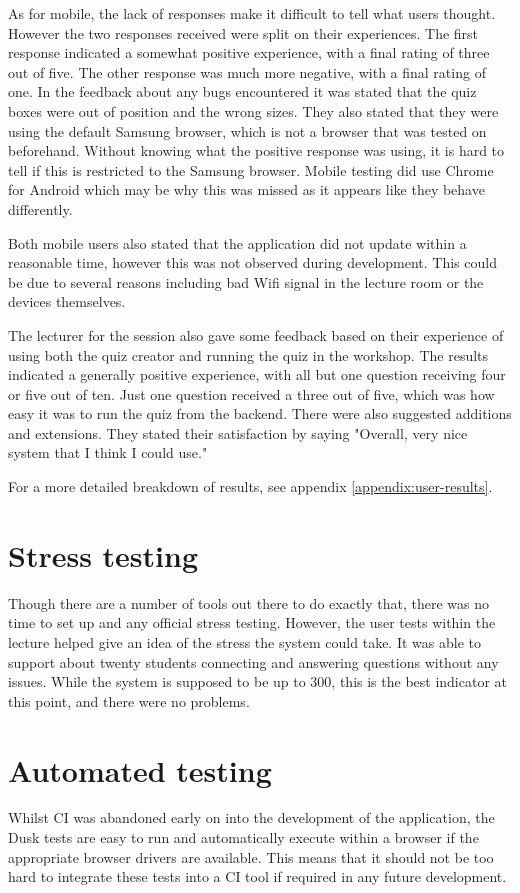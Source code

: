 As for mobile, the lack of responses make it difficult to tell what users thought. However the two responses received were split on their experiences. The first response indicated a somewhat positive experience, with a final rating of three out of five. The other response was much more negative, with a final rating of one. In the feedback about any bugs encountered it was stated that the quiz boxes were out of position and the wrong sizes. They also stated that they were using the default Samsung browser, which is not a browser that was tested on beforehand. Without knowing what the positive response was using, it is hard to tell if this is restricted to the Samsung browser. Mobile testing did use Chrome for Android which may be why this was missed as it appears like they behave differently.

Both mobile users also stated that the application did not update within a reasonable time, however this was not observed during development. This could be due to several reasons including bad Wifi signal in the lecture room or the devices themselves.

The lecturer for the session also gave some feedback based on their experience of using both the quiz creator and running the quiz in the workshop. The results indicated a generally positive experience, with all but one question receiving four or five out of ten. Just one question received a three out of five, which was how easy it was to run the quiz from the backend. There were also suggested additions and extensions. They stated their satisfaction by saying "Overall, very nice system that I think I could use."

For a more detailed breakdown of results, see appendix \ref{appendix:user-results}.

\section{Stress testing}
Though there are a number of tools out there to do exactly that, there was no time to set up and any official stress testing. However, the user tests within the lecture helped give an idea of the stress the system could take. It was able to support about twenty students connecting and answering questions without any issues. While the system is supposed to be up to 300, this is the best indicator at this point, and there were no problems.

\section{Automated testing}
Whilst CI was abandoned early on into the development of the application, the Dusk tests are easy to run and automatically execute within a browser if the appropriate browser drivers are available. This means that it should not be too hard to integrate these tests into a CI tool if required in any future development.